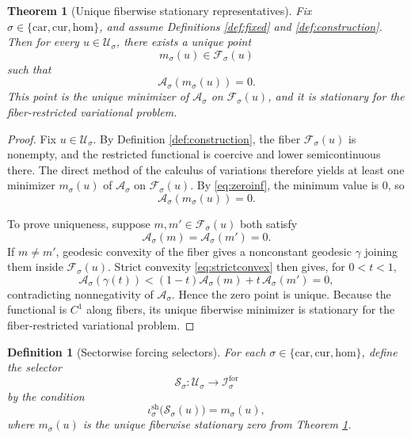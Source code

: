 \documentclass[11pt]{article}
\newcommand{\Car}{\mathrm{car}}
\newcommand{\Cur}{\mathrm{cur}}
\newcommand{\Hom}{\mathrm{hom}}
\newcommand{\ForSpace}[1]{\mathcal I_{#1}^{\mathrm{for}}}
\newcommand{\Fiber}[1]{\mathcal F_{#1}}
\newcommand{\ShellEmbed}[1]{\iota_{#1}^{\mathrm{sh}}}
\newcommand{\StationaryFunctional}[1]{\mathscr A_{#1}}
\newcommand{\DeepSpace}[1]{\mathcal U_{#1}}
\newcommand{\ChainSelect}[1]{\mathcal S_{#1}}
\newtheorem{definition}{Definition}
\newtheorem{theorem}{Theorem}
\begin{document}
\begin{theorem}[Unique fiberwise stationary representatives]
\label{thm:minimizer}
Fix \(\sigma\in\{\Car,\Cur,\Hom\}\), and assume Definitions \ref{def:fixed} and \ref{def:construction}. Then for every \(u\in\DeepSpace{\sigma}\), there exists a unique point
\[
m_{\sigma}(u)\in\Fiber{\sigma}(u)
\]
such that
\[
\StationaryFunctional{\sigma}(m_{\sigma}(u))=0.
\]
This point is the unique minimizer of \(\StationaryFunctional{\sigma}\) on \(\Fiber{\sigma}(u)\), and it is stationary for the fiber-restricted variational problem.
\end{theorem}

\begin{proof}
Fix \(u\in\DeepSpace{\sigma}\). By Definition \ref{def:construction}, the fiber \(\Fiber{\sigma}(u)\) is nonempty, and the restricted functional is coercive and lower semicontinuous there. The direct method of the calculus of variations therefore yields at least one minimizer \(m_{\sigma}(u)\) of \(\StationaryFunctional{\sigma}\) on \(\Fiber{\sigma}(u)\). By \eqref{eq:zeroinf}, the minimum value is \(0\), so
\[
\StationaryFunctional{\sigma}(m_{\sigma}(u))=0.
\]

To prove uniqueness, suppose \(m,m'\in\Fiber{\sigma}(u)\) both satisfy
\[
\StationaryFunctional{\sigma}(m)=
\StationaryFunctional{\sigma}(m')=0.
\]
If \(m\neq m'\), geodesic convexity of the fiber gives a nonconstant geodesic \(\gamma\) joining them inside \(\Fiber{\sigma}(u)\). Strict convexity \eqref{eq:strictconvex} then gives, for \(0<t<1\),
\[
\StationaryFunctional{\sigma}(\gamma(t))
<
(1-t)\StationaryFunctional{\sigma}(m)
+
t\,\StationaryFunctional{\sigma}(m')
=
0,
\]
contradicting nonnegativity of \(\StationaryFunctional{\sigma}\). Hence the zero point is unique. Because the functional is \(C^{1}\) along fibers, its unique fiberwise minimizer is stationary for the fiber-restricted variational problem.
\end{proof}

\begin{definition}[Sectorwise forcing selectors]
\label{def:selector}
For each \(\sigma\in\{\Car,\Cur,\Hom\}\), define the selector
\[
\ChainSelect{\sigma}:\DeepSpace{\sigma}\to\ForSpace{\sigma}
\]
by the condition
\begin{equation}
\ShellEmbed{\sigma}\bigl(\ChainSelect{\sigma}(u)\bigr)
=
m_{\sigma}(u),
\label{eq:selectordef}
\end{equation}
where \(m_{\sigma}(u)\) is the unique fiberwise stationary zero from Theorem \ref{thm:minimizer}.
\end{definition}
\end{document}
